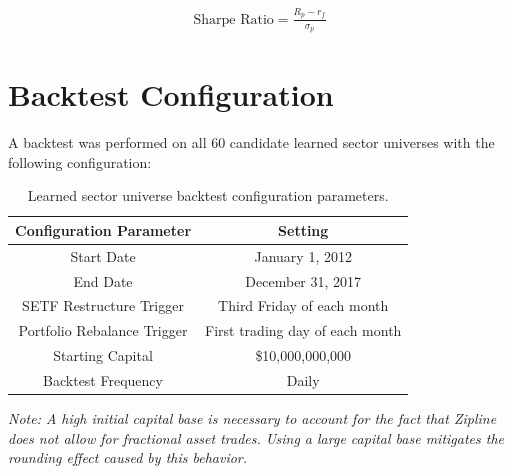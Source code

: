 \documentclass[../main.tex]{subfiles}
\begin{document}
\begin{gather*}
    \text{Sharpe Ratio} = \frac{R_p - r_f}{\sigma_p}
\end{gather*}


\section{Backtest Configuration} \label{candidate_universe_ranking:backtest_config}

A backtest was performed on all 60 candidate learned sector universes with the following configuration:

\begin{table}[h!]
    \centering
    \begin{tabular}{|c|c|}
        \hline
        \textbf{Configuration Parameter} & \textbf{Setting} \\
        \hline
        Start Date & January 1, 2012 \\
        End Date & December 31, 2017 \\
        SETF Restructure Trigger & Third Friday of each month \\
        Portfolio Rebalance Trigger & First trading day of each month \\
        Starting Capital & \$10,000,000,000 \\
        Backtest Frequency & Daily \\
        \hline
    \end{tabular}
    \caption{Learned sector universe backtest configuration parameters.}
    \label{table:candidate_universe_ranking:backtest_configuration}
\end{table}

\textit{Note: A high initial capital base is necessary to account for the fact that Zipline does not allow for fractional asset trades. Using a large capital base mitigates the rounding effect caused by this behavior.}
\end{document}
